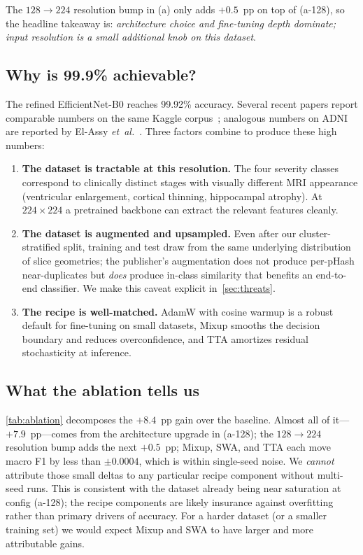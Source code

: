 \documentclass[journal,onecolumn,11pt]{IEEEtran}
\begin{document}
The $128 \to 224$ resolution bump in (a) only adds $+0.5$~pp on top of
(a-128), so the headline takeaway is: \emph{architecture choice and
fine-tuning depth dominate; input resolution is a small additional knob
on this dataset}.

\subsection{Why is 99.9\% achievable?}

The refined EfficientNet-B0 reaches 99.92\% accuracy. Several recent papers
report comparable numbers on the same Kaggle
corpus~\cite{ellatif2023lightweight,hussain2025finetuned}; analogous
numbers on ADNI are reported by El-Assy \textit{et~al.}~\cite{elassy2024novelcnn}.
Three factors combine to produce these high numbers:

\begin{enumerate}[leftmargin=*,itemsep=2pt,topsep=2pt]
  \item \textbf{The dataset is tractable at this resolution.} The four
    severity classes correspond to clinically distinct stages with
    visually different MRI appearance (ventricular enlargement, cortical
    thinning, hippocampal atrophy). At $224{\times}224$ a pretrained
    backbone can extract the relevant features cleanly.
  \item \textbf{The dataset is augmented and upsampled.} Even after our
    cluster-stratified split, training and test draw from the same
    underlying distribution of slice geometries; the publisher's
    augmentation does not produce per-pHash near-duplicates but
    \emph{does} produce in-class similarity that benefits an end-to-end
    classifier. We make this caveat explicit
    in~\cref{sec:threats}.
  \item \textbf{The recipe is well-matched.} AdamW with cosine warmup
    is a robust default for fine-tuning on small datasets, Mixup
    smooths the decision boundary and reduces overconfidence, and TTA
    amortizes residual stochasticity at inference.
\end{enumerate}

\subsection{What the ablation tells us}

\cref{tab:ablation} decomposes the $+8.4$~pp gain over the baseline.
Almost all of it---$+7.9$~pp---comes from the architecture upgrade in
(a-128); the $128 \to 224$ resolution bump adds the next $+0.5$~pp;
Mixup, SWA, and TTA each move macro F1 by less than $\pm 0.0004$, which
is within single-seed noise. We \emph{cannot} attribute those small
deltas to any particular recipe component without multi-seed runs.
This is consistent with the dataset already being near saturation at
config (a-128); the recipe components are likely insurance against
overfitting rather than primary drivers of accuracy. For a harder
dataset (or a smaller training set) we would expect Mixup and SWA to
have larger and more attributable gains.
\end{document}
